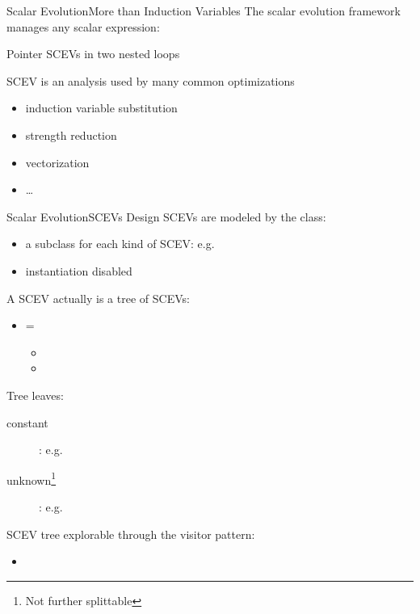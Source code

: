 \begin{frame}{Scalar Evolution}{More than Induction Variables}
The scalar evolution framework manages \alert{any scalar expression}:

\begin{block}{Pointer SCEVs in two nested loops}
\centering
{}
\end{block}

\vfill
SCEV is an analysis used by many common optimizations
\begin{itemize}
\small
\item induction variable substitution
\item strength reduction
\item vectorization
\item \ldots
\end{itemize}
\end{frame}


\begin{frame}{Scalar Evolution}{SCEVs Design}
SCEVs are modeled by the  class:

\begin{itemize}
\item a subclass for each kind of SCEV: e.g. 
\item instantiation disabled
\end{itemize}

\vfill
A SCEV actually is a tree of SCEVs:

\begin{itemize}
\item {} =
\begin{itemize}
\item			{}
\item     {}
\end{itemize}
\end{itemize}

Tree leaves:

\begin{description}
\item[constant] : e.g. 
\item[unknown\footnote{Not further splittable}] :
                                                 e.g. 
\end{description}

\vfill
SCEV tree explorable through the visitor pattern:

\begin{itemize}
\item {}
\end{itemize}
\end{frame}


